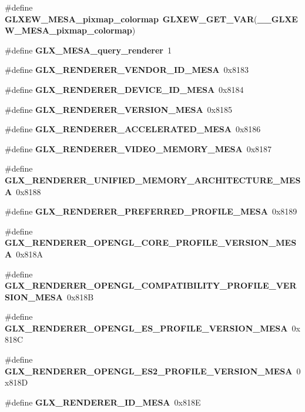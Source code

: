\begin{DoxyCompactItemize}
\item 
\#define {\bf G\+L\+X\+E\+W\+\_\+\+M\+E\+S\+A\+\_\+pixmap\+\_\+colormap}~{\bf G\+L\+X\+E\+W\+\_\+\+G\+E\+T\+\_\+\+V\+AR}({\bf \+\_\+\+\_\+\+G\+L\+X\+E\+W\+\_\+\+M\+E\+S\+A\+\_\+pixmap\+\_\+colormap})
\item 
\#define {\bf G\+L\+X\+\_\+\+M\+E\+S\+A\+\_\+query\+\_\+renderer}~1
\item 
\#define {\bf G\+L\+X\+\_\+\+R\+E\+N\+D\+E\+R\+E\+R\+\_\+\+V\+E\+N\+D\+O\+R\+\_\+\+I\+D\+\_\+\+M\+E\+SA}~0x8183
\item 
\#define {\bf G\+L\+X\+\_\+\+R\+E\+N\+D\+E\+R\+E\+R\+\_\+\+D\+E\+V\+I\+C\+E\+\_\+\+I\+D\+\_\+\+M\+E\+SA}~0x8184
\item 
\#define {\bf G\+L\+X\+\_\+\+R\+E\+N\+D\+E\+R\+E\+R\+\_\+\+V\+E\+R\+S\+I\+O\+N\+\_\+\+M\+E\+SA}~0x8185
\item 
\#define {\bf G\+L\+X\+\_\+\+R\+E\+N\+D\+E\+R\+E\+R\+\_\+\+A\+C\+C\+E\+L\+E\+R\+A\+T\+E\+D\+\_\+\+M\+E\+SA}~0x8186
\item 
\#define {\bf G\+L\+X\+\_\+\+R\+E\+N\+D\+E\+R\+E\+R\+\_\+\+V\+I\+D\+E\+O\+\_\+\+M\+E\+M\+O\+R\+Y\+\_\+\+M\+E\+SA}~0x8187
\item 
\#define {\bf G\+L\+X\+\_\+\+R\+E\+N\+D\+E\+R\+E\+R\+\_\+\+U\+N\+I\+F\+I\+E\+D\+\_\+\+M\+E\+M\+O\+R\+Y\+\_\+\+A\+R\+C\+H\+I\+T\+E\+C\+T\+U\+R\+E\+\_\+\+M\+E\+SA}~0x8188
\item 
\#define {\bf G\+L\+X\+\_\+\+R\+E\+N\+D\+E\+R\+E\+R\+\_\+\+P\+R\+E\+F\+E\+R\+R\+E\+D\+\_\+\+P\+R\+O\+F\+I\+L\+E\+\_\+\+M\+E\+SA}~0x8189
\item 
\#define {\bf G\+L\+X\+\_\+\+R\+E\+N\+D\+E\+R\+E\+R\+\_\+\+O\+P\+E\+N\+G\+L\+\_\+\+C\+O\+R\+E\+\_\+\+P\+R\+O\+F\+I\+L\+E\+\_\+\+V\+E\+R\+S\+I\+O\+N\+\_\+\+M\+E\+SA}~0x818A
\item 
\#define {\bf G\+L\+X\+\_\+\+R\+E\+N\+D\+E\+R\+E\+R\+\_\+\+O\+P\+E\+N\+G\+L\+\_\+\+C\+O\+M\+P\+A\+T\+I\+B\+I\+L\+I\+T\+Y\+\_\+\+P\+R\+O\+F\+I\+L\+E\+\_\+\+V\+E\+R\+S\+I\+O\+N\+\_\+\+M\+E\+SA}~0x818B
\item 
\#define {\bf G\+L\+X\+\_\+\+R\+E\+N\+D\+E\+R\+E\+R\+\_\+\+O\+P\+E\+N\+G\+L\+\_\+\+E\+S\+\_\+\+P\+R\+O\+F\+I\+L\+E\+\_\+\+V\+E\+R\+S\+I\+O\+N\+\_\+\+M\+E\+SA}~0x818C
\item 
\#define {\bf G\+L\+X\+\_\+\+R\+E\+N\+D\+E\+R\+E\+R\+\_\+\+O\+P\+E\+N\+G\+L\+\_\+\+E\+S2\+\_\+\+P\+R\+O\+F\+I\+L\+E\+\_\+\+V\+E\+R\+S\+I\+O\+N\+\_\+\+M\+E\+SA}~0x818D
\item 
\#define {\bf G\+L\+X\+\_\+\+R\+E\+N\+D\+E\+R\+E\+R\+\_\+\+I\+D\+\_\+\+M\+E\+SA}~0x818E
\item 

\end{DoxyCompactItemize}
